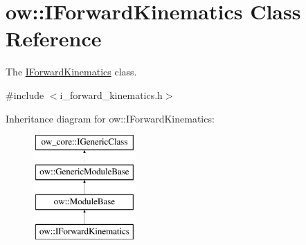 \hypertarget{classow_1_1IForwardKinematics}{}\section{ow\+:\+:I\+Forward\+Kinematics Class Reference}
\label{classow_1_1IForwardKinematics}


The \hyperlink{classow_1_1IForwardKinematics}{I\+Forward\+Kinematics} class.  




{\ttfamily \#include $<$i\+\_\+forward\+\_\+kinematics.\+h$>$}

Inheritance diagram for ow\+:\+:I\+Forward\+Kinematics\+:\begin{figure}[H]
\begin{center}
\leavevmode
\includegraphics[height=4.000000cm]{d3/de5/classow_1_1IForwardKinematics}
\end{center}
\end{figure}
